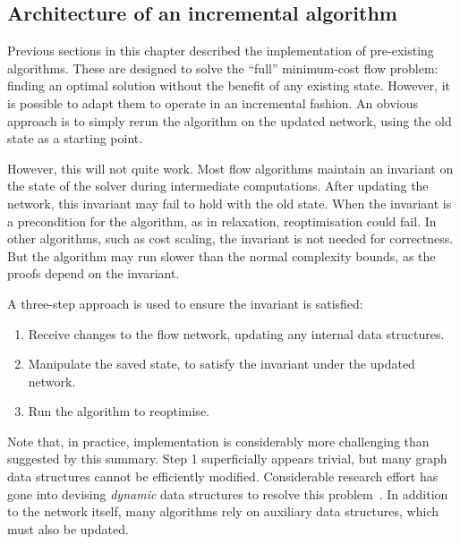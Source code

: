 \subsection{Architecture of an incremental algorithm} \label{sec:impl-incremental-architecture}

Previous sections in this chapter described the implementation of pre-existing algorithms. These are designed to solve the ``full'' minimum-cost flow problem: finding an optimal solution without the benefit of any existing state. However, it is possible to adapt them to operate in an incremental fashion. An obvious approach is to simply rerun the algorithm on the updated network, using the old state as a starting point.

However, this will not quite work. Most flow algorithms maintain an invariant on the state of the solver during intermediate computations. After updating the network, this invariant may fail to hold with the old state. When the invariant is a precondition for the algorithm, as in relaxation, reoptimisation could fail. In other algorithms, such as cost scaling, the invariant is not needed for correctness. But the algorithm may run slower than the normal complexity bounds, as the proofs depend on the invariant. 

A three-step approach is used to ensure the invariant is satisfied:

\begin{enumerate}
    \item Receive changes to the flow network, updating any internal data structures.
    \item Manipulate the saved state, to satisfy the invariant under the updated network.
    \item Run the algorithm to reoptimise.
\end{enumerate}

Note that, in practice, implementation is considerably more challenging than suggested by this summary. Step 1 superficially appears trivial, but many graph data structures cannot be efficiently modified. Considerable research effort has gone into devising \emph{dynamic} data structures to resolve this problem~\cite{Tarjan:1983,Eppstein:1996}. In addition to the network itself, many algorithms rely on auxiliary data structures\footnotemark, which must also be updated.

